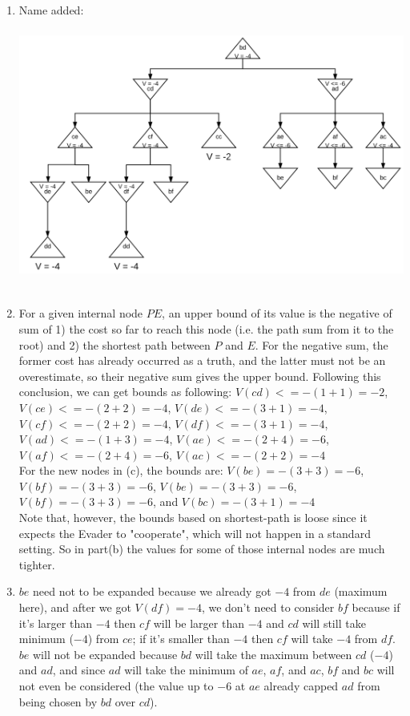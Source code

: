 \documentclass[11pt]{article}
\begin{document}
\begin{onehalfspace}
\begin{enumerate}
     \item Name added:\\
     \includegraphics[width=16cm, height=9cm]{1_c.png}\\
     \item
     For a given internal node $PE$, an upper bound of its value is the negative of sum of 1) the cost so far to reach this node (i.e. the path sum from it to the root) and 2) the shortest path between $P$ and $E$. For the negative sum, the former cost has already occurred as a truth, and the latter must not be an overestimate, so their negative sum gives the upper bound. Following this conclusion, we can get bounds as following: $V(cd) <= -(1+1) = -2$, $V(ce) <= -(2+2) = -4$, $V(de) <= -(3+1) = -4$, $V(cf) <= -(2+2) = -4$, $V(df) <= -(3+1) = -4$, $V(ad) <= -(1+3) = -4$, $V(ae) <= -(2+4) = -6$, $V(af) <= -(2+4) = -6$, $V(ac) <= -(2+2) = -4$\\
     For the new nodes in (c), the bounds are: $V(be) = -(3+3) = -6$, $V(bf) = -(3+3) = -6$, $V(be) = -(3+3) = -6$, $V(bf) = -(3+3) = -6$, and $V(bc) = -(3+1) = -4$\\
     Note that, however, the bounds based on shortest-path is loose since it expects the Evader to "cooperate", which will not happen in a standard setting. So in part(b) the values for some of those internal nodes are much tighter.\\
     \item $be$ need not to be expanded because we already got $-4$ from $de$ (maximum here), and after we got $V(df) = -4$, we don't need to consider $bf$ because if it's larger than $-4$ then $cf$ will be larger than $-4$ and $cd$ will still take minimum ($-4$) from $ce$; if it's smaller than $-4$ then $cf$ will take $-4$ from $df$. $be$ will not be expanded because $bd$ will take the maximum between $cd$ ($-4$) and $ad$, and since $ad$ will take the minimum of $ae$, $af$, and $ac$, $bf$ and $bc$ will not even be considered (the value up to $-6$ at $ae$ already capped $ad$ from being chosen by $bd$ over $cd$).\\

\end{enumerate}
\end{onehalfspace}
\end{document}
